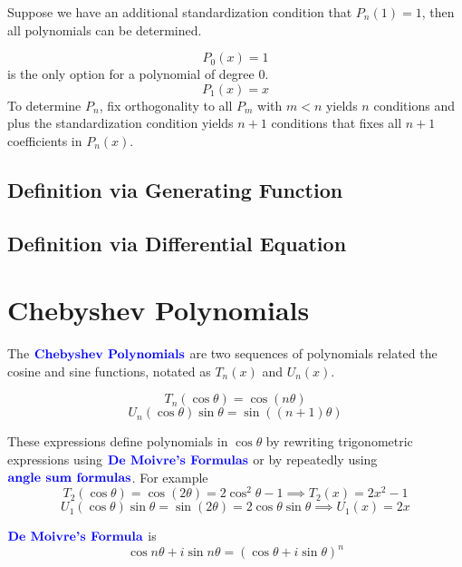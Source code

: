 \documentclass[12pt]{scrartcl}
\begin{document}
\begin{definition}
    
\end{definition}

\begin{note}
    Suppose we have an additional standardization condition that $P_n(1) = 1$, then all polynomials can be determined.
\end{note}

\begin{lemma}
    \[P_0(x) = 1\]
is the only option for a polynomial of degree $0$.
\[P_1(x) = x\] 
To determine $P_n$, fix orthogonality to all $P_m$ with $m < n$ yields $n$ conditions and plus the standardization condition yields $n + 1$ conditions that fixes all $n + 1$ coefficients in $P_n(x)$.
\end{lemma}

\subsection{Definition via Generating Function}

\subsection{Definition via Differential Equation}

\section{Chebyshev Polynomials}

\begin{definition}
    The $\textbf{\color{blue} Chebyshev Polynomials}$ are two sequences of polynomials related the cosine and sine functions, notated as $T_n(x)$ and $U_n(x)$.

\[T_n(\cos \theta) = \cos(n \theta)\]
\[U_n(\cos\theta)\sin\theta = \sin((n+1)\theta)\]
\end{definition}

\begin{lemma}
    These expressions define polynomials in $\cos \theta$ by rewriting trigonometric expressions using $\textbf{\color{blue} De Moivre's Formulas}$ or by repeatedly using $\textbf{\color{blue} angle sum formulas}$. For example
    \[T_2(\cos \theta) = \cos(2\theta) = 2\cos^2\theta - 1 \implies T_2(x) = 2x^2 -1\]
    \[U_1(\cos\theta)\sin\theta = \sin(2\theta) = 2\cos\theta\sin\theta \implies U_1(x) = 2x\]
\end{lemma}

\begin{definition}
    $\textbf{\color{blue} De Moivre's Formula}$ is
\[\cos n\theta + i\sin n\theta = (\cos \theta + i \sin \theta)^n\]
\end{definition}
\end{document}
